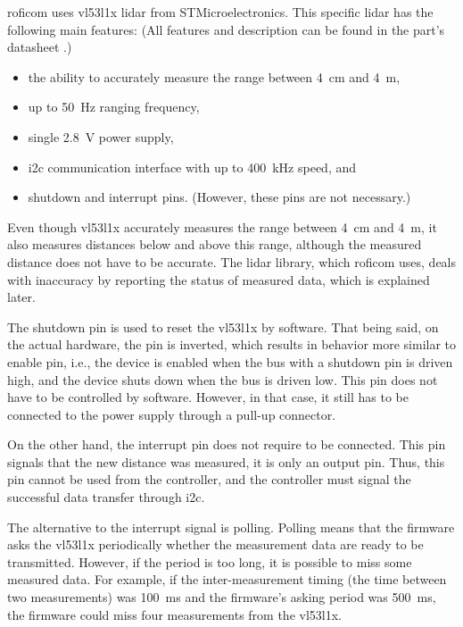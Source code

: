 \documentclass[
  digital,     %
  oneside,     %
  nosansbold,  %
  nocolorbold, %
  nolof,         %
  nolot,         %
]{fithesis4}
\begin{document}
{{{\acrshort{roficom} uses \gls{vl53l1x} \acrshort{lidar} from STMicroelectronics. This specific \acrshort{lidar} has the following main features: (All features and description can be found in the part's datasheet \cite{vl53l1x}.)

\begin{itemize}
    \item the ability to accurately measure the range between \qty{4}{\centi\metre} and \qty{4}{\metre},
    \item up to \qty{50}{\hertz} ranging frequency,
    \item single \qty{2.8}{\volt} power supply,
    \item \acrshort{i2c} communication interface with up to \qty{400}{\kilo\hertz} speed, and
    \item shutdown and interrupt pins. (However, these pins are not necessary.)
\end{itemize}

Even though \gls{vl53l1x} accurately measures the range between \qty{4}{\centi\metre} and \qty{4}{\metre}, it also measures distances below and above this range, although the measured distance does not have to be accurate. The lidar library, which \acrshort{roficom} uses, deals with inaccuracy by reporting the status of measured data, which is explained later.

The shutdown pin is used to reset the \gls{vl53l1x} by software. That being said, on the actual hardware, the pin is inverted, which results in behavior more similar to enable pin, i.e., the device is enabled when the bus with a shutdown pin is driven high, and the device shuts down when the bus is driven low. This pin does not have to be controlled by software. However, in that case, it still has to be connected to the power supply through a pull-up connector.

On the other hand, the interrupt pin does not require to be connected. This pin signals that the new distance was measured, it is only an output pin. Thus, this pin cannot be used from the controller, and the controller must signal the successful data transfer through \acrshort{i2c}.

The alternative to the interrupt signal is polling. Polling means that the firmware asks the \gls{vl53l1x} periodically whether the measurement data are ready to be transmitted. However, if the period is too long, it is possible to miss some measured data. For example, if the inter-measurement timing (the time between two measurements) was \qty{100}{\milli\second} and the firmware's asking period was \qty{500}{\milli\second}, the firmware could miss four measurements from the \gls{vl53l1x}.

}}}
\end{document}
